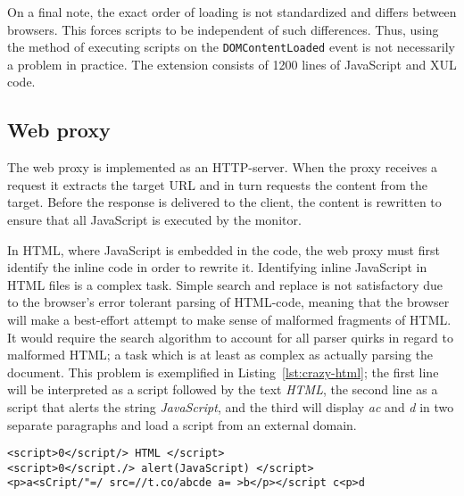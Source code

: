 \documentclass{llncs}
\newcommand{\todo}[1]{\colorbox{red}{\textcolor{white}{\sffamily\bfseries\scriptsize TODO}} \textcolor{red}{#1} \textcolor{red}{$\blacktriangleleft$}}
\begin{document}
On a final note, the exact order of loading is not standardized and differs between
browsers. This forces scripts to be independent of such differences. Thus,
using the method of executing scripts on the \lstinline{DOMContentLoaded} event is not
necessarily a problem in practice. 
%
The extension consists of 1200 lines of JavaScript and XUL code.



\vspace{-.4cm}
\subsection{Web proxy}
\vspace{-.2cm}

The web proxy is implemented as an HTTP-server. When the 
proxy receives a request it extracts the target URL and in turn requests the 
content from the target. Before the response is delivered to the client, the content is 
rewritten to ensure that all JavaScript is executed by the monitor. 

In HTML, where 
JavaScript is embedded in the code, the web proxy must first identify 
the inline code in order to rewrite it.
Identifying inline JavaScript in HTML files is a complex task. 
Simple search and replace is not satisfactory due to the browser's error tolerant parsing of HTML-code, meaning that the 
browser will make a best-effort attempt to make sense of malformed fragments of 
HTML. It would require the search 
algorithm to account for all parser quirks in regard to malformed HTML;
a task which is at least as complex as actually parsing the document.
This problem is exemplified in Listing~\ref{lst:crazy-html}; the first line
will be interpreted as a script followed by the text \emph{HTML}, the second
line as a script that alerts the string \emph{JavaScript}, and the third will 
display \emph{ac} and \emph{d} in two separate paragraphs and load a script
from an external domain.

\begin{lstlisting}[language=langsmall,label=lst:crazy-html, caption=Example of complicated HTML]
<script>0</script/> HTML </script>
<script>0</script./> alert(JavaScript) </script>
<p>a<sCript/"=/ src=//t.co/abcde a= >b</p></script c<p>d
\end{lstlisting}
\end{document}

